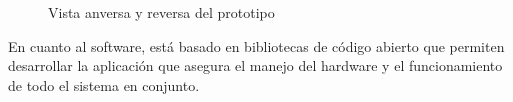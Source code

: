 \begin{figure}[H]
  \centering

  \caption{Vista anversa y reversa del prototipo}\label{protoFB}
\end{figure}

En cuanto al software, está basado en bibliotecas de código abierto que permiten desarrollar la aplicación que asegura el manejo del hardware y el funcionamiento de todo el sistema en conjunto.


